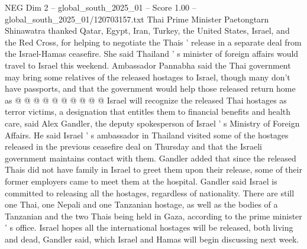 \begin{textsample}{NEG Dim 2 – global\_south\_2025\_01 – Score 1.00 – global\_south\_2025\_01/120703157.txt}
Thai Prime Minister Paetongtarn Shinawatra thanked Qatar, Egypt, Iran, Turkey, the United States, Israel, and the Red Cross, for helping to negotiate the Thais ' release in a separate deal from the Israel-Hamas ceasefire.
She said Thailand ' s minister of foreign affairs would travel to Israel this weekend.
Ambassador Pannabha said the Thai government may bring some relatives of the released hostages to Israel, though many don't have passports, and that the government would help those released return home as @ @ @ @ @ @ @ @ @ @ Israel will recognize the released Thai hostages as terror victims, a designation that entitles them to financial benefits and health care, said Alex Gandler, the deputy spokesperson of Israel ' s Ministry of Foreign Affairs.
He said Israel ' s ambassador in Thailand visited some of the hostages released in the previous ceasefire deal on Thursday and that the Israeli government maintains contact with them.
Gandler added that since the released Thais did not have family in Israel to greet them upon their release, some of their former employers came to meet them at the hospital.
Gandler said Israel is committed to releasing all the hostages, regardless of nationality.
There are still one Thai, one Nepali and one Tanzanian hostage, as well as the bodies of a Tanzanian and the two Thais being held in Gaza, according to the prime minister ' s office.
Israel hopes all the international hostages will be released, both living and dead, Gandler said, which Israel and Hamas will begin discussing next week.

\end{textsample}
